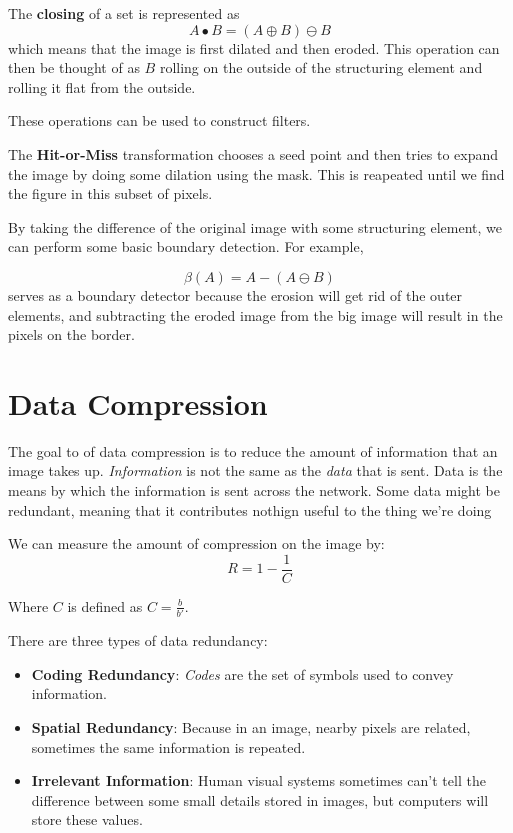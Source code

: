 \documentclass{tufte-handout}
\begin{document}
The \textbf{closing} of a set is represented as 
\[A \bullet B = (A\oplus B)\ominus B\]
which means that the image is first dilated and then eroded. This operation 
can then be thought of as $B$ rolling on the outside of the structuring 
element and rolling it flat from the outside.

These operations can be used to construct filters.

The \textbf{Hit-or-Miss} transformation chooses a seed point and then tries
to expand the image by doing some dilation using the mask. This is reapeated
until we find the figure in this subset of pixels.

By taking the difference of the original image with some structuring element,
we can perform some basic boundary detection. For example, 

\[\beta(A) = A - (A\ominus B)\]
serves as a boundary detector because the erosion will get rid of the outer
elements, and subtracting the eroded image from the big image will result in 
the pixels on the border. 

\section{Data Compression}
The goal to of data compression is to reduce the amount of information 
that an image takes up. \textit{Information} is not the same as the 
\textit{data} that is sent. Data is the means by which the information 
is sent across the network. Some data might be redundant, meaning that 
it contributes nothign useful to the thing we're doing

We can measure the amount of compression on the image by:
\[R = 1 - \frac{1}{C}\]

Where $C$ is defined as $C = \frac{b}{b'}$.

There are three types of data redundancy:
\begin{itemize}
	\item \textbf{Coding Redundancy}: \emph{Codes} are the set of symbols used
			to convey information. 
	\item \textbf{Spatial Redundancy}: Because in an image, nearby pixels are related,
			sometimes the same information is repeated.
	\item \textbf{Irrelevant Information}: Human visual systems sometimes can't tell
			the difference between some small details stored in images, but computers
			will store these values.
\end{itemize}
\end{document}
